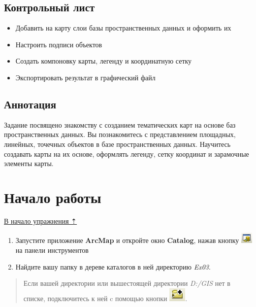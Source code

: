 \documentclass[12pt,]{book}
\providecommand{\tightlist}{%
  \setlength{\itemsep}{0pt}\setlength{\parskip}{0pt}}
\begin{document}
\hypertarget{map-design-climates-control}{%
\subsection{Контрольный лист}\label{map-design-climates-control}}

\begin{itemize}
\tightlist
\item
  Добавить на карту слои базы пространственных данных и оформить их
\item
  Настроить подписи объектов
\item
  Создать компоновку карты, легенду и координатную сетку
\item
  Экспортировать результат в графический файл
\end{itemize}

\hypertarget{map-design-climates-annotation}{%
\subsection{Аннотация}\label{map-design-climates-annotation}}

Задание посвящено знакомству с созданием тематических карт на основе баз
пространственных данных. Вы познакомитесь с представлением площадных,
линейных, точечных объектов в базе пространственных данных. Научитесь
создавать карты на их основе, оформлять легенду, сетку координат и
зарамочные элементы карты.

\hypertarget{map-design-climates-begin}{%
\section{Начало работы}\label{map-design-climates-begin}}

\protect\hyperlink{map-design-climates}{В начало упражнения ⇡}

\begin{enumerate}
\def\labelenumi{\arabic{enumi}.}
\item
  Запустите приложение \textbf{ArcMap} и откройте окно \textbf{Catalog}, нажав кнопку \includegraphics{images/Ex03/image5.png} на панели инструментов
\item
  Найдите вашу папку в дереве каталогов в ней директорию \emph{Ex03}.
\end{enumerate}

\begin{quote}
Если вашей директории или вышестоящей директории \emph{D:/GIS} нет в списке, подключитесь к ней c помощью кнопки \includegraphics{images/Ex03/image6.png}.
\end{quote}
\end{document}

